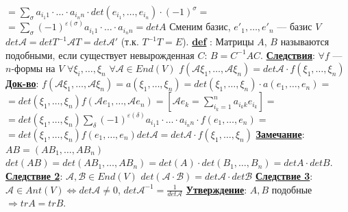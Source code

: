 \documentclass[12pt,a4paper]{article}
\newcommand{\bfline}[1]{\textbf{\underline{#1}}}
\newcommand{\Def}{\bfline{def} }
\begin{document}
$=\sum\limits_{\sigma} a_{i_1 1} \cdot \ldots \cdot a_{i_n n} \cdot det(e_{i_1}, \ldots, e_{i_n}) \cdot {(-1)}^{\sigma} = $\newline
$=\sum\limits_{\sigma} {(-1)}^{\varepsilon(\sigma)} a_{i_1 1} \cdot \ldots \cdot a_{i_n n} = det A$ \newline
Сменим базис, $e'_1, \ldots, e'_n$ --- базис $V$ \newline
$det \mathcal{A} = det T^{-1} \mathcal{A} T = det \mathcal{A}'$ (т.к. $T^{-1} T = E$). \newline
\Def : Матрицы $A$, $B$ называются подобными, если существует невырожденная $C$: $B = C^{-1} A C$. \newline
\bfline{Следствия}: $\forall f$ --- $n$-формы на $V$ \newline
$\forall \xi_i, \ldots, \xi_n$ $\forall \mathcal{A} \in End(V)$ \newline
$f(\mathcal{A} \xi_1, \ldots, \mathcal{A} \xi_n) = det \mathcal{A} \cdot f(\xi_1, \ldots, \xi_n)$ \newline
\bfline{Док-во}: $f(\mathcal{A} \xi_1, \ldots, \mathcal{A} \xi_n) = a(\xi_1, \ldots, \xi_n) = det(\xi_1, \ldots, \xi_n) \cdot a(e_1, \ldots, e_n)=$ \newline %
$=det(\xi_1, \ldots, \xi_n) f(\mathcal{A} e_1, \ldots, \mathcal{A} e_n)=\left[ \mathcal{A} e_k = \sum\limits_{i_k=1}^{n} a_{i_k k} e_{i_k}\right]=$ \newline
$=det(\xi_1, \ldots, \xi_n) \sum\limits_{\delta} {(-1)}^{\varepsilon(\delta)} a_{i_1 1} \cdot \ldots \cdot a_{i_n n} \cdot f(e_1, \ldots, e_n) =$ \newline
$=det(\xi_1, \ldots, \xi_n) f(e_1, \ldots, e_n) det \mathcal{A} = det \mathcal{A} \cdot f(\xi_1, \ldots, \xi_n)$ \newline
\bfline{Замечание}: \newline
$A B = (A B_1, \ldots, A B_n)$ \newline
$det(AB) = det(A B_1, \ldots, A B_n) = det(A) \cdot det(B_1, \ldots, B_n) = det A \cdot det B$. \newline
\bfline{Следствие 2}: $\mathcal{A}, \mathcal{B} \in End(V)$ \newline
$det (\mathcal{A} \cdot \mathcal{B}) = det \mathcal{A} \cdot det \mathcal{B}$ \newline
\bfline{Следствие 3}: $\mathcal{A} \in Ant(V) \Leftrightarrow det \mathcal{A} \neq 0$, $det \mathcal{A}^{-1} = \frac{1}{det \mathcal{A}}$ \newline
\bfline{Утверждение}: $A, B$ подобные $\Rightarrow tr A = tr B$. \newline
\end{document}
